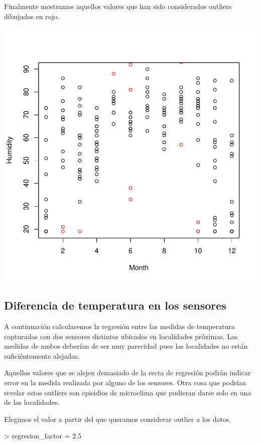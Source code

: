 \documentclass [a4paper] {article}
\begin{document}
Finalmente mostramos aquellos valores que han sido considerados outliers dibujados en rojo.
\begin{center}
\includegraphics{entrega-datos_humedad_mes_filtrados}
\end{center}

\newpage
\subsection{Diferencia de temperatura en los sensores}

A continuación calcularemos la regresión entre las medidas de temperatura capturadas con dos sensores distintos ubicados en localidades próximas.
Las medidas de ambos deberían de ser muy parecidad pues las localidades no están suficiéntemente alejadas.

Aquellos valores que se alejen demasiado de la recta de regresión podrán indicar error en la medida realizada por alguno de los sensores.
Otra cosa que podrían revelar estos outliers son episidios de microclima que pudieran darse solo en una de las localidades.

Elegimos el valor a partir del que queramos considerar outlier a los datos.
\begin{Schunk}
\begin{Sinput}
> regresion_factor = 2.5
\end{Sinput}
\end{Schunk}
\end{document}
